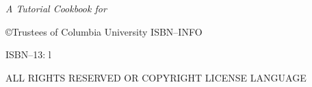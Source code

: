 \documentclass[10pt,twoside,openright]{memoir}
\begin{document}
\pagestyle{headings}
\let\cleardoublepage\clearpage
\maketitle
\frontmatter

\null\vfill

\begin{flushleft}
\textit{A Tutorial Cookbook for \TF}


\copyright{Trustees of Columbia University}
ISBN--INFO

ISBN--13: 
\bigskip
l




ALL RIGHTS RESERVED OR COPYRIGHT LICENSE LANGUAGE




\end{flushleft}
\let\cleardoublepage\clearpage

\newpage
\tableofcontents*
\mainmatter
\sloppy






\end{document}
